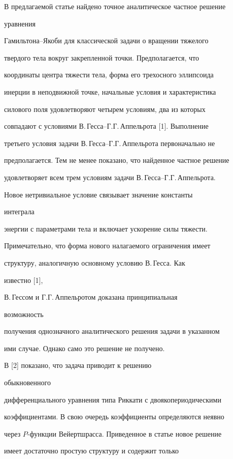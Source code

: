 \label{begin}





В предлагаемой статье найдено точное аналитическое частное решение


уравнения


Гамильто\-на--Якоби для классической задачи о вращении тяжелого


твердого тела вокруг закрепленной точки. Предполагается, что


координаты центра тяжести тела, форма его трехосного эллипсоида


инерции в неподвижной точке, начальные условия и характеристика


силового поля удовлетворяют четырем условиям, два из которых


совпадают с условиями В.\,Гесса--Г.Г.\,Аппельрота [1]. Выполнение


третьего условия задачи В.\,Гесса--Г.Г.\,Аппельрота первоначально не


предполагается. Тем не менее показано, что найденное частное решение


удовлетворяет всем трем условиям задачи В.\,Гесса--Г.Г.\,Аппельрота.


Новое нетривиальное условие связывает значение константы


интеграла


энергии с параметрами тела и включает ускорение силы тяжести.


Примечательно, что форма нового налагаемого ограничения имеет


структуру, аналогичную основному условию В.\,Гесса. Как


известно [1],


В.\,Гессом и Г.Г.\,Аппельротом доказана принципиальная


возможность


получения однозначного аналитического решения задачи в указанном


ими случае. Однако само это решение не получено.


В [2] показано, что задача приводит к решению


обыкновенного


дифференциального уравнения типа Риккати с двоякопериодическими


коэффициентами. В свою очередь коэффициенты определяются неявно


через $P$-функции Вейертшрасса. Приведенное в статье новое решение


имеет достаточно простую структуру и содержит только



